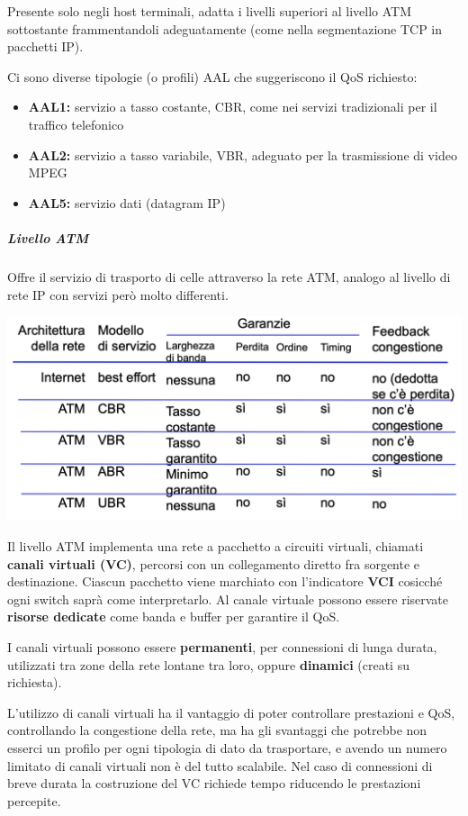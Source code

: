 \documentclass{report}
\begin{document}
Presente solo negli host terminali, adatta i livelli superiori al
livello ATM sottostante frammentandoli adeguatamente (come nella
segmentazione TCP in pacchetti IP).

Ci sono diverse tipologie (o profili) AAL che suggeriscono il QoS
richiesto:

\begin{itemize}
\item
  \textbf{AAL1:} servizio a tasso costante, CBR, come nei servizi
  tradizionali per il traffico telefonico
\item
  \textbf{AAL2:} servizio a tasso variabile, VBR, adeguato per la
  trasmissione di video MPEG
\item
  \textbf{AAL5:} servizio dati (datagram IP)
\end{itemize}

\hypertarget{header-n388}{%
\subparagraph{Livello ATM}\label{header-n388}}

Offre il servizio di trasporto di celle attraverso la rete ATM, analogo
al livello di rete IP con servizi però molto differenti.

\begin{center}
		\includegraphics[width=0.7\linewidth]{servizi-atm}
	\end{center}

Il livello ATM implementa una rete a pacchetto a circuiti virtuali,
chiamati \textbf{canali virtuali (VC)}, percorsi con un collegamento
diretto fra sorgente e destinazione. Ciascun pacchetto viene marchiato
con l'indicatore \textbf{VCI} cosicché ogni switch saprà come
interpretarlo. Al canale virtuale possono essere riservate
\textbf{risorse dedicate} come banda e buffer per garantire il QoS.

I canali virtuali possono essere \textbf{permanenti}, per connessioni di
lunga durata, utilizzati tra zone della rete lontane tra loro, oppure
\textbf{dinamici} (creati su richiesta).

L'utilizzo di canali virtuali ha il vantaggio di poter controllare
prestazioni e QoS, controllando la congestione della rete, ma ha gli
svantaggi che potrebbe non esserci un profilo per ogni tipologia di dato
da trasportare, e avendo un numero limitato di canali virtuali non è del
tutto scalabile. Nel caso di connessioni di breve durata la costruzione
del VC richiede tempo riducendo le prestazioni percepite.
\end{document}
